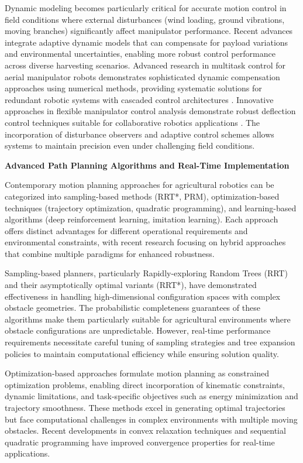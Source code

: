 \documentclass[a4paper,fleqn]{cas-dc}
\begin{document}
Dynamic modeling becomes particularly critical for accurate motion control in field conditions where external disturbances (wind loading, ground vibrations, moving branches) significantly affect manipulator performance. Recent advances integrate adaptive dynamic models that can compensate for payload variations and environmental uncertainties, enabling more robust control performance across diverse harvesting scenarios. Advanced research in multitask control for aerial manipulator robots demonstrates sophisticated dynamic compensation approaches using numerical methods, providing systematic solutions for redundant robotic systems with cascaded control architectures \cite{CARVAJAL2024104614}. Innovative approaches in flexible manipulator control analysis demonstrate robust deflection control techniques suitable for collaborative robotics applications \cite{SARKHEL2023104293}. The incorporation of disturbance observers and adaptive control schemes allows systems to maintain precision even under challenging field conditions.

\textbf{Advanced Path Planning Algorithms and Real-Time Implementation}

Contemporary motion planning approaches for agricultural robotics can be categorized into sampling-based methods (RRT*, PRM), optimization-based techniques (trajectory optimization, quadratic programming), and learning-based algorithms (deep reinforcement learning, imitation learning). Each approach offers distinct advantages for different operational requirements and environmental constraints, with recent research focusing on hybrid approaches that combine multiple paradigms for enhanced robustness.

Sampling-based planners, particularly Rapidly-exploring Random Trees (RRT) and their asymptotically optimal variants (RRT*), have demonstrated effectiveness in handling high-dimensional configuration spaces with complex obstacle geometries. The probabilistic completeness guarantees of these algorithms make them particularly suitable for agricultural environments where obstacle configurations are unpredictable. However, real-time performance requirements necessitate careful tuning of sampling strategies and tree expansion policies to maintain computational efficiency while ensuring solution quality.

Optimization-based approaches formulate motion planning as constrained optimization problems, enabling direct incorporation of kinematic constraints, dynamic limitations, and task-specific objectives such as energy minimization and trajectory smoothness. These methods excel in generating optimal trajectories but face computational challenges in complex environments with multiple moving obstacles. Recent developments in convex relaxation techniques and sequential quadratic programming have improved convergence properties for real-time applications.
\end{document}
